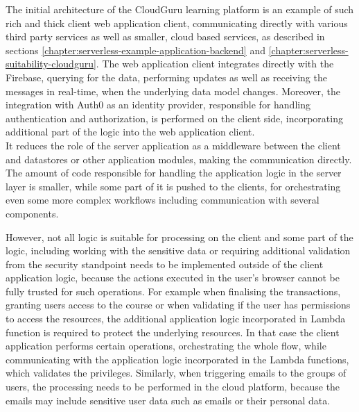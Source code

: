 The initial architecture of the CloudGuru learning platform is an example of such rich and thick client web application client, communicating directly with various third party services as well as smaller, cloud based services, as described in sections \ref{chapter:serverless-example-application-backend} and \ref{chapter:serverless-suitability-cloudguru}.
The web application client integrates directly with the Firebase, querying for the data, performing updates as well as receiving the messages in real-time, when the underlying data model changes.
Moreover, the integration with Auth0 as an identity provider, responsible for handling authentication and authorization, is performed on the client side, incorporating additional part of the logic into the web application client. \\

It reduces the role of the server application as a middleware between the client and datastores or other application modules, making the communication directly.
The amount of code responsible for handling the application logic in the server layer is smaller, while some part of it is pushed to the clients, for orchestrating even some more complex workflows including communication with several components.

However, not all logic is suitable for processing on the client and some part of the logic, including working with the sensitive data or requiring additional validation from the security standpoint needs to be implemented outside of the client application logic, because the actions executed in the user's browser cannot be fully trusted for such operations.
For example when finalising the transactions, granting users access to the course or when validating if the user has permissions to access the resources, the additional application logic incorporated in Lambda function is required to protect the underlying resources.
In that case the client application performs certain operations, orchestrating the whole flow, while communicating with the application logic incorporated in the Lambda functions, which validates the privileges.
Similarly, when triggering emails to the groups of users, the processing needs to be performed in the cloud platform, because the emails may include sensitive user data such as emails or their personal data. 

